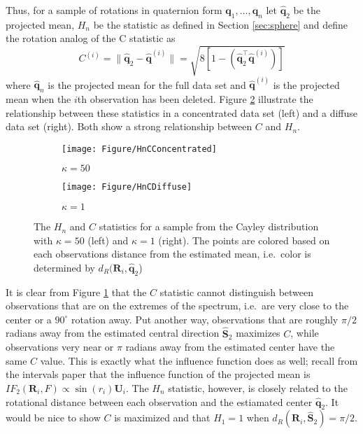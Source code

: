 \documentclass{article}\usepackage{graphicx, color}
\newcommand{\ProjMean}{{\widehat{\bm S}_{2}}}
\begin{document}
Thus, for a sample of rotations in quaternion form $\bm q_1,\dots,\bm q_n$ let $\hat{\bm q}_2$ be the projected mean, $H_n$ be the statistic as defined in Section \ref{sec:sphere} and define the rotation analog of the C statistic as 
\[
C^{(i)}=\|\hat{\bm q}_2-\hat{\bm q}^{(i)}\|=\sqrt{8[1-(\hat{\bm q}_2^\top\hat{\bm q}^{(i)})]}
\]
where $\hat{\bm q}_n$ is the projected mean for the full data set and $\hat{\bm q}^{(i)}$ is the projected mean when the $i$th observation has been deleted.  Figure \ref{fig:HnC} illustrate the relationship between these statistics in a concentrated data set (left) and a diffuse data set (right).  Both show a strong relationship between $C$ and $H_n$.







\begin{figure}
\centering
\begin{subfigure}[b]{0.45\textwidth}
        \texttt{[image: Figure/HnCConcentrated]}
        \caption{$\kappa=50$}
\end{subfigure}
\begin{subfigure}[b]{0.45\textwidth}
        \texttt{[image: Figure/HnCDiffuse]}
        \caption{$\kappa=1$}
        \label{fig:HnDiff}
\end{subfigure}
\caption{The $H_n$ and $C$ statistics for a sample from the Cayley distribution with $\kappa=50$ (left) and $\kappa=1$ (right).  The points are colored based on each observations distance from the estimated mean, i.e.~color is determined by $d_R(\bm R_i,\hat{\bm q}_2$)}
\label{fig:HnC}
\end{figure}

It is clear from Figure \ref{fig:HnDiff} that the $C$ statistic cannot distinguish between observations that are on the extremes of the spectrum, i.e.~are very close to the center or a $90^\circ$ rotation away.  Put another way, observations that are roughly $\pi/2$ radians away from the estimated central direction $\ProjMean$ maximizes $C$, while observations very near or $\pi$ radians away from the estimated center have the same $C$ value.  This is exactly what the influence function does as well; recall from the intervals paper that the influence function of the projected mean is $IF_2(\bm R_i,F)\propto\sin(r_i)\bm U_i$.  The $H_n$ statistic, however, is closely related to the rotational distance between each observation and the estiamated center $\hat{\bm q}_2$.  It would be nice to show $C$ is maximized and that $H_1=1$ when $d_R(\bm R_i,\ProjMean)=\pi/2$. 
\end{document}
